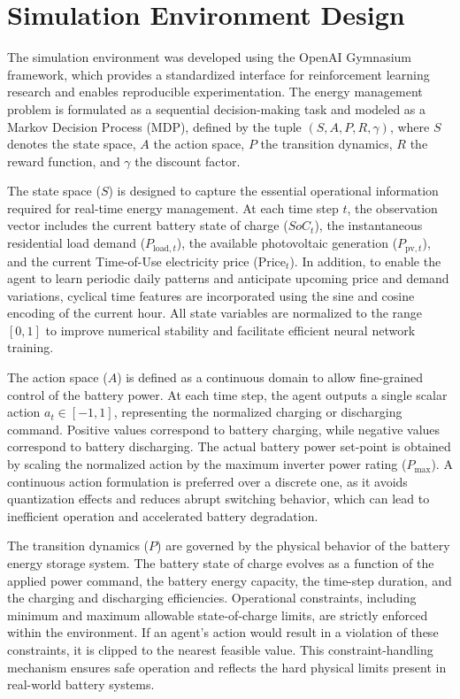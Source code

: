 \section{Simulation Environment Design}

The simulation environment was developed using the OpenAI Gymnasium framework, which provides a standardized interface for reinforcement learning research and enables reproducible experimentation. The energy management problem is formulated as a sequential decision-making task and modeled as a Markov Decision Process (MDP), defined by the tuple $(S, A, P, R, \gamma)$, where $S$ denotes the state space, $A$ the action space, $P$ the transition dynamics, $R$ the reward function, and $\gamma$ the discount factor.

The state space ($S$) is designed to capture the essential operational information required for real-time energy management. At each time step $t$, the observation vector includes the current battery state of charge ($SoC_t$), the instantaneous residential load demand ($P_{\text{load},t}$), the available photovoltaic generation ($P_{\text{pv},t}$), and the current Time-of-Use electricity price ($\text{Price}_t$). In addition, to enable the agent to learn periodic daily patterns and anticipate upcoming price and demand variations, cyclical time features are incorporated using the sine and cosine encoding of the current hour. All state variables are normalized to the range $[0,1]$ to improve numerical stability and facilitate efficient neural network training.

The action space ($A$) is defined as a continuous domain to allow fine-grained control of the battery power. At each time step, the agent outputs a single scalar action $a_t \in [-1,1]$, representing the normalized charging or discharging command. Positive values correspond to battery charging, while negative values correspond to battery discharging. The actual battery power set-point is obtained by scaling the normalized action by the maximum inverter power rating ($P_{\max}$). A continuous action formulation is preferred over a discrete one, as it avoids quantization effects and reduces abrupt switching behavior, which can lead to inefficient operation and accelerated battery degradation.

The transition dynamics ($P$) are governed by the physical behavior of the battery energy storage system. The battery state of charge evolves as a function of the applied power command, the battery energy capacity, the time-step duration, and the charging and discharging efficiencies. Operational constraints, including minimum and maximum allowable state-of-charge limits, are strictly enforced within the environment. If an agent’s action would result in a violation of these constraints, it is clipped to the nearest feasible value. This constraint-handling mechanism ensures safe operation and reflects the hard physical limits present in real-world battery systems.

